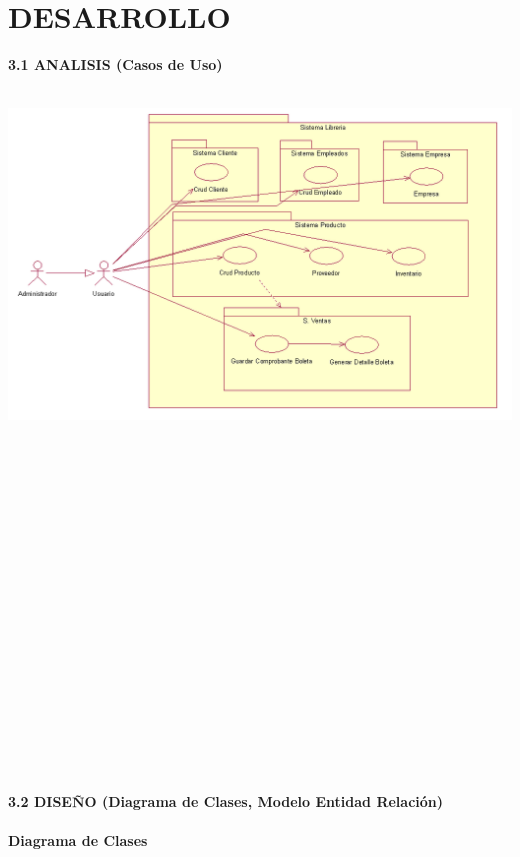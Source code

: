 \section{DESARROLLO} 
\begin{flushleft}
\textbf {3.1 ANALISIS (Casos de Uso)}\\

\textbf{}\\
\begin{center}
	\includegraphics[width=19cm]{./Imagenes/img2} 
	\end{center}
\textbf{}\\
\textbf{}\\
\textbf{}\\
\textbf{}\\
\textbf{}\\
\textbf{}\\
\textbf{}\\
\textbf{}\\
\textbf{}\\
\textbf{}\\
\textbf{}\\
\textbf{}\\
\textbf{}\\
\textbf{}\\
\textbf{}\\
\textbf{}\\
\textbf{}\\
\textbf{}\\
\textbf {3.2 DISEÑO (Diagrama de Clases, Modelo Entidad Relación)}\\
\textbf{}\\
\textbf {Diagrama de Clases}\\
\begin{center}

\end{center}
\end{flushleft}
